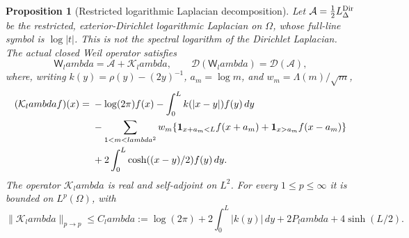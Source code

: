 \documentclass[11pt]{article}
\def\lambda{lambda}%
\newtheorem{proposition}[theorem]{Proposition}
\theoremstyle{remark}
\begin{document}
\begin{proposition}[Restricted logarithmic Laplacian decomposition]
\label{prop:v118-log-dirichlet}
Let $\mathcal A=\tfrac12L_\Delta^{\rm Dir}$ be the restricted,
exterior-Dirichlet logarithmic Laplacian on $\Omega$, whose full-line
symbol is $\log|t|$.  This is not the spectral logarithm of the
Dirichlet Laplacian.  The actual closed Weil operator satisfies
\begin{equation}\label{eq:v118-log-decomposition}
 \mathsf W_\lambda=\mathcal A+\mathcal K_\lambda,
 \qquad \mathcal D(\mathsf W_\lambda)=\mathcal D(\mathcal A),
\end{equation}
where, writing $k(y)=\rho(y)-(2y)^{-1}$, $a_m=\log m$, and
$w_m=\Lambda(m)/\sqrt m$,
\begin{align}
 (\mathcal K_\lambda f)(x)={}&-\log(2\pi)f(x)
       -\int_0^L k(|x-y|)f(y)\,dy\notag\\
 &-\sum_{1<m<\lambda^2}w_m
       \{\mathbf1_{x+a_m<L}f(x+a_m)
                   +\mathbf1_{x>a_m}f(x-a_m)\}\notag\\
 &+2\int_0^L\cosh((x-y)/2)f(y)\,dy.
 \label{eq:v118-bounded-physical-part}
\end{align}
The operator $\mathcal K_\lambda$ is real and self-adjoint on $L^2$.
For every $1\le p\le\infty$ it is bounded on $L^p(\Omega)$, with
\begin{equation}\label{eq:v118-K-bound}
 \|\mathcal K_\lambda\|_{p\to p}\le C_\lambda
 :=\log(2\pi)+2\int_0^L|k(y)|\,dy
                  +2P_\lambda+4\sinh(L/2).
\end{equation}
\end{proposition}
\end{document}
